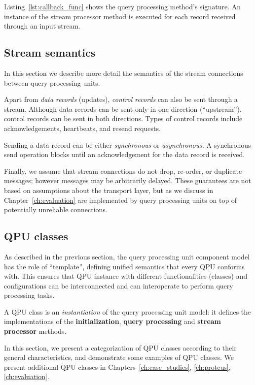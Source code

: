 \noindent
Listing~\ref{lst:callback_func} shows the query processing method's signature.
An instance of the stream processor method is executed for each record received through an input stream.

\subsection{Stream semantics}

In this section we describe more detail the semantics of the stream connections between query processing units.

\medskip
\noindent
Apart from \textit{data records} (updates), \textit{control records} can also be sent through a stream.
Although data records can be sent only in one direction (``upstream''), control records can be sent in both directions.
Types of control records include acknowledgements, heartbeats, and resend requests.

\medskip
\noindent
Sending a data record can be either \textit{synchronous} or \textit{asynchronous}.
A synchronous send operation blocks until an acknowledgement for the data record is received.

\medskip
\noindent
Finally, we assume that stream connections do not drop, re-order, or duplicate messages;
however messages may be arbitrarily delayed.
These guarantees are not based on assumptions about the transport layer, but as we discuss in Chapter~\ref{ch:evaluation}
are implemented by query processing units on top of potentially unreliable connections.

\subsection{QPU classes}
\label{sec:qpu_classes}

As described in the previous section, the query processing unit component model has the role of ``template'',
defining unified semantics that every QPU conforms with.
This ensures that QPU instance with different functionalities (classes) and configurations can be interconnected and
can interoperate to perform query processing tasks.

A QPU class is an \textit{instantiation} of the query processing unit model:
it defines the implementations of the \textbf{initialization}, \textbf{query processing} and \textbf{stream processor}
methods.

In this section, we present a categorization of QPU classes according to their general characteristics,
and demonstrate some examples of QPU classes.
We present additional QPU classes in Chapters~\ref{ch:case_studies}, \ref{ch:proteus}, \ref{ch:evaluation}.


